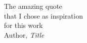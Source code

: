 \thispagestyle{empty}
\begin{flushright}

\vspace*{60mm}

The amazing quote\\
that I chose as inspiration\\
for this work\\
\vspace{4mm}
Author, \textit{Title}\\




\end{flushright}